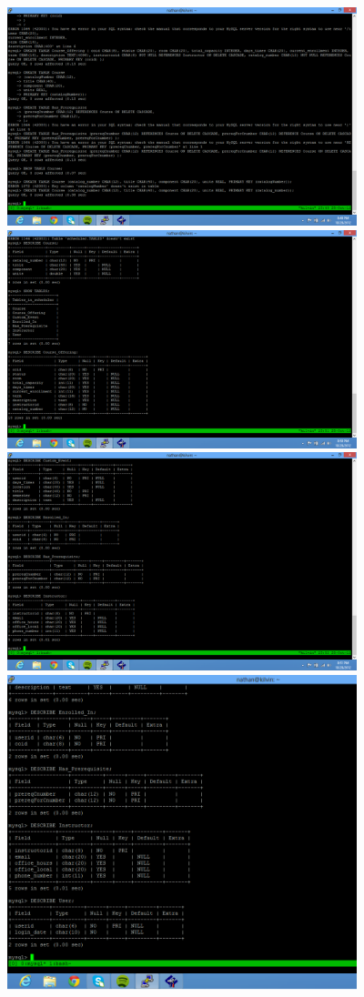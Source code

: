 \documentclass[pdftex,12pt,letter]{article}
\begin{document}
\begin{flushleft}
\FloatBarrier
\includegraphics[width=4in]{db5.png}
\FloatBarrier
\includegraphics[width=4in]{db6.png}
\FloatBarrier
\includegraphics[width=4in]{db7.png}
\FloatBarrier
\includegraphics[width=4in]{db8.png}
\FloatBarrier
\end{flushleft}
\end{document}
